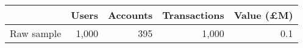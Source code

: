 \begin{tabular}{lrrrr}
\toprule
           & Users & Accounts & Transactions & Value (\pounds M) \\
\midrule
Raw sample & 1,000 &      395 &        1,000 &               0.1 \\
\bottomrule
\end{tabular}
